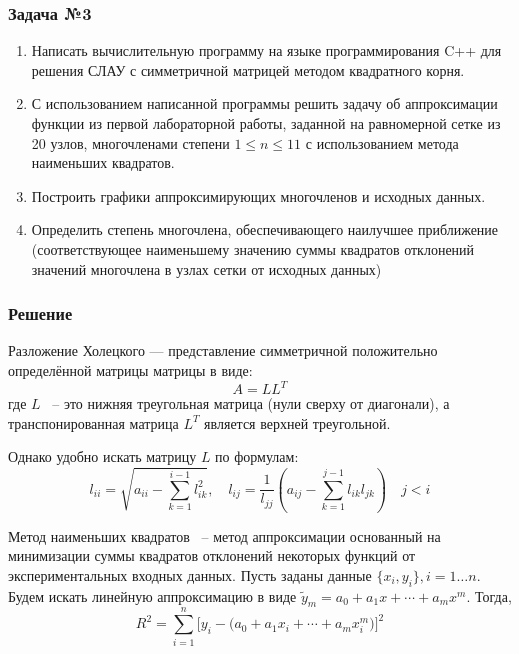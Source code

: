 \documentclass[a4paper, fontsize=14pt]{article}
\begin{document}
\subsubsection*{Задача №3}
\begin{enumerate}
    \item Написать вычислительную программу на языке программирования C++
    для решения СЛАУ с симметричной матрицей методом квадратного
    корня.
    \item С использованием написанной программы решить задачу об
    аппроксимации функции из первой лабораторной работы, заданной на
    равномерной сетке из 20 узлов, многочленами степени $1 \leq n \leq 11$ с
    использованием метода наименьших квадратов.
    \item Построить графики аппроксимирующих многочленов и исходных
    данных.
    \item Определить степень многочлена, обеспечивающего наилучшее
    приближение (соответствующее наименьшему значению суммы
    квадратов отклонений значений многочлена в узлах сетки от исходных
    данных)
\end{enumerate}
\subsubsection*{Решение}
Разложение Холецкого — представление симметричной положительно определённой матрицы матрицы в виде:
\begin{equation*}
    A = L L^T
\end{equation*}
где $L$ ~-- это нижняя треугольная матрица (нули сверху от
диагонали), а транспонированная матрица $L^T$ является верхней
треугольной. 

Однако удобно искать матрицу $L$ по формулам:
\begin{equation*}
    l_{ii} = \sqrt{a_{ii} - \sum_{k=1}^{i-1} l^2_{ik}}, \quad l_{ij} = \frac{1}{l_{jj}} \left( a_{ij} - \sum_{k=1}^{j-1} l_{ik} l_{jk}\right) \quad j < i
\end{equation*}

Метод наименьших квадратов ~-- метод аппроксимации основанный на минимизации суммы квадратов отклонений некоторых функций от экспериментальных входных данных. 
Пусть заданы данные $\{ x_i, y_i\}, i = 1 \dots n$. Будем искать линейную аппроксимацию в виде $\tilde{y}_m = a_0 + a_1 x + \cdots + a_m x^m$. Тогда,
\begin{equation*}
    R^2 = \sum_{i=1}^n \biggr[ y_i - \bigr(a_0 + a_1 x_i + \cdots + a_m x_i^m\bigr)\biggr]^2
\end{equation*}
\end{document}
